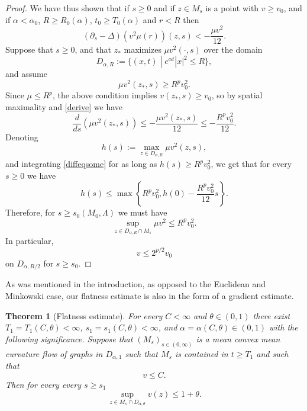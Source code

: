 \documentclass[leqno,11pt]{amsart}
\newtheorem{theorem}{Theorem}[section]
\theoremstyle{definition}
\begin{document}
\begin{proof}
We have thus shown that if ${s \geq 0}$ and if {$z\in M_{s}$} is a point with $v\geq v_0$, and if $\alpha<\alpha_0$, $R\geq R_0(\alpha)$,  $t_0 \geq T_0(\alpha)$  and $r<R$ then
\begin{equation}\label{derive}
(\partial_s-\Delta)(v^2\mu(r))(z,s) < { -\frac{\mu v^2}{12}}.
\end{equation}
Suppose that  $s\geq 0$, and that $z_{\ast}$ maximizes $\mu v^2(\cdot,s)$ over the domain
\begin{equation}
D_{\alpha,R}:=\{(x,t)\;|\; e^{\alpha t}|x|^2\leq R\},
\end{equation}
and assume  
\[
\mu v^2(z_{\ast},s) \geq R^pv_0^2.
\]
Since $\mu\leq R^p$, the above condition implies  $v(z_{\ast},s)\geq v_0$, so by spatial maximality and \eqref{derive} we have
\begin{equation}\label{diffeqsome}
\frac{d}{ds}\left(\mu v^2(z_{\ast},s)\right) \leq -\frac{\mu v^2{(z_{\ast},s)}}{12} \leq -\frac{R^pv_0^2}{12}. 
\end{equation}
{Denoting  
\begin{equation}
h(s):=\max_{z \in D_{\alpha,R}} \mu v^2(z,s), 
\end{equation}
and integrating \eqref{diffeqsome} for as long as $h(s)\geq R^pv_0^2$,} we get that for every $s\geq 0$ we have
\begin{equation}
h(s) \leq \max\left\{ R^pv_0^2,h(0)-\frac{R^pv_0^2}{12}s\right\}. 
\end{equation}
Therefore, for $s\geq s_0(M_0,\Lambda) $ we must have 
\begin{equation}
\sup_{z\in D_{\alpha,R}\cap M_s}\mu v^2 \leq R^p v_0^2.
\end{equation}  
In particular,
\begin{equation}
v \leq 2^{p/2}v_0
\end{equation} 
on $D_{\alpha,R/2}$ for $s\geq s_0$. 

\end{proof}

\bigskip

As was mentioned in the introduction, as opposed to the Euclidean and Minkowski case, our flatness estimate is also in the form of a gradient estimate.


\begin{theorem}[Flatness estimate]\label{flat_est}
For every $C<\infty$ and { $\theta\in (0,1)$}  there exist  $T_1=T_1(C,\theta)<\infty$, $s_1=s_1(C,\theta)<\infty$, and $\alpha=\alpha(C,\theta){\in (0,1)}$ with the following significance. Suppose that $(M_s)_{s\in (0,\infty)}$ is a mean convex mean curvature flow of graphs in $D_{\alpha,1}$ such that $M_s$ is contained in $t\geq T_1$ and  such that  
\begin{equation}\label{vA_bd}
v \leq C.
\end{equation}
Then for every every $s\geq s_1$ 
\begin{equation}
\sup_{z\in M_s\cap D_{\alpha,\theta}} v(z) \leq 1+\theta. 
\end{equation}
\end{theorem}
\end{document}
